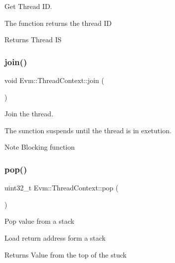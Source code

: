 Get Thread ID. 

The function returns the thread ID \begin{DoxyReturn}{Returns}
Thread IS 
\end{DoxyReturn}
\mbox{\label{struct_evm_1_1_thread_context_a990679f6118a8ba97d1a25400768c7c8}} 
\subsubsection{\texorpdfstring{join()}{join()}}
{\footnotesize\ttfamily void Evm\+::\+Thread\+Context\+::join (\begin{DoxyParamCaption}{ }\end{DoxyParamCaption})}



Join the thread. 

The sunction suspends until the thread is in exetution. \begin{DoxyNote}{Note}
Blocking function 
\end{DoxyNote}
\mbox{\label{struct_evm_1_1_thread_context_aaa860b37b80d9f68292c04df7f7bf030}} 
\subsubsection{\texorpdfstring{pop()}{pop()}}
{\footnotesize\ttfamily uint32\+\_\+t Evm\+::\+Thread\+Context\+::pop (\begin{DoxyParamCaption}{ }\end{DoxyParamCaption})}

Pop value from a stack

Load return address form a stack \begin{DoxyReturn}{Returns}
Value from the top of the stuck 
\end{DoxyReturn}
\mbox{\label{struct_evm_1_1_thread_context_a25d16549548a3c6dc375e25da9729ccc}} 
